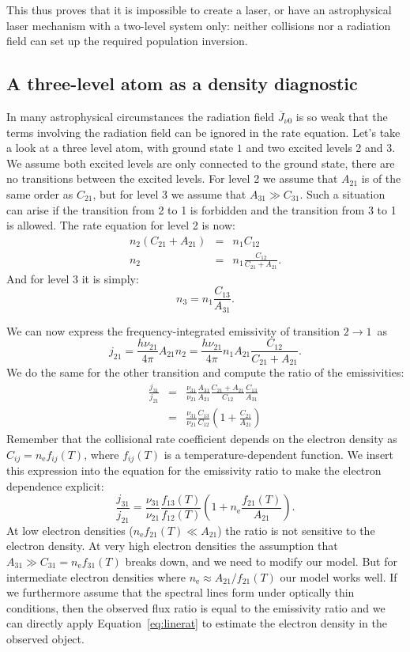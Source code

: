 \documentclass[12pt]{article}
\numberwithin{equation}{section}
\def\nelec{\ensuremath{n_\mathrm{e}}}
\def\Jbar{\ensuremath{\overline{J}_{\nu0}}}
\newcommand{\be}{\begin{equation}}
\newcommand{\ee}{\end{equation}}
\newcommand{\bea}{\begin{eqnarray}}
\newcommand{\eea}{\end{eqnarray}}
\begin{document}
This thus proves that it is impossible to create a laser, or have an astrophysical laser mechanism with a two-level system only: neither collisions nor a radiation field can set up the required population inversion.

\subsection{A three-level atom as a density diagnostic} 

In many astrophysical circumstances the radiation field $\Jbar$ is so weak that the terms involving the radiation field can be ignored in the rate equation. Let's take a look at a three level atom, with ground state $1$ and two excited levels 2 and 3. We assume both excited levels are only connected to the ground state, there are no transitions between the excited levels.
For level 2 we assume that $A_{21}$ is of the same order as $C_{21}$, but for level 3 we assume that  $A_{31} \gg C_{31}$.  Such a situation can arise if the transition from 2 to 1 is forbidden and the transition from 3 to 1 is allowed.
The rate equation for level 2 is now:
\bea
n_2 (C_{21}+A_{21}) &=& n_1 C_{12} \nonumber \\
n_2 &=& n_1 \frac{C_{12}}{C_{21}+A_{21}}.
\eea
And for level 3 it is simply:
\be
n_3=n_1 \frac{C_{13}}{A_{31}}.
\ee

We can now express the frequency-integrated emissivity of transition \mbox{$2 \rightarrow 1$ }as
\be
j_{21} = \frac{h \nu_{21}}{4 \pi} A_{21} n_2 =  \frac{h \nu_{21}}{4 \pi} n_1 A_{21} \frac{C_{12}}{C_{21}+A_{21}}.
\ee
We do the same for the other transition and compute the ratio of the emissivities:
\bea
\frac{j_{31}}{j_{21}} &=& \frac{\nu_{31}}{\nu_{21}} \frac{A_{31}}{A_{21}} \frac{C_{21}+A_{21}}{C_{12}} \frac{C_{13}}{A_{31}} \nonumber \\
&=& \frac{\nu_{31}}{\nu_{21}} \frac{C_{13}}{C_{12}} \left(1+\frac{C_{21}}{A_{21}} \right)
\eea
Remember that the collisional rate coefficient depends on the electron density as $C_{ij} = \nelec f_{ij}(T)$, where $f_{ij}(T)$ is a temperature-dependent function. We insert this expression into the equation for the emissivity ratio to make the electron dependence explicit:
\be \label{eq:linerat}
\frac{j_{31}}{j_{21}} = \frac{\nu_{31}}{\nu_{21}} \frac{f_{13}(T)}{f_{12}(T)} \left(1+\nelec\frac{f_{21}(T)}{A_{21}} \right).
\ee
 At low electron densities ($\nelec f_{21}(T) \ll A_{21}$) the ratio is not sensitive to the electron density. At very high electron densities the assumption that $A_{31} \gg C_{31}= \nelec f_{31}(T)$ breaks down, and we need to modify our model. But for intermediate electron densities where $\nelec \approx A_{21}/ f_{21}(T)$ our model works well. If we furthermore assume that the spectral lines form under optically thin conditions, then the observed flux ratio is equal to the emissivity ratio and we can directly apply Equation~\ref{eq:linerat} to estimate the electron density in the observed object.
 
\end{document}
